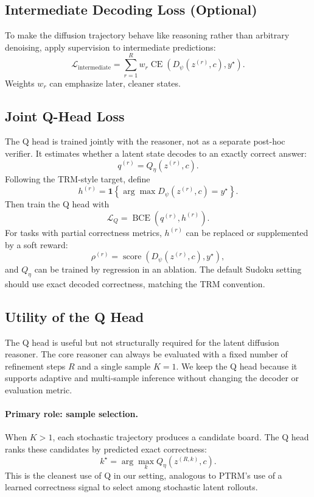 \documentclass[11pt]{article}
\begin{document}
\subsection{Intermediate Decoding Loss (Optional)}

To make the diffusion trajectory behave like reasoning rather than arbitrary denoising, apply supervision to intermediate predictions:
\[
    \mathcal L_{\mathrm{intermediate}}
    =
    \sum_{r=1}^{R} w_r
    \operatorname{CE}(D_\psi(z^{(r)},c),y^\star).
\]
Weights \(w_r\) can emphasize later, cleaner states.

\subsection{Joint Q-Head Loss}

The Q head is trained jointly with the reasoner, not as a separate post-hoc verifier. It estimates whether a latent state decodes to an exactly correct answer:
\[
    q^{(r)} = Q_\eta(z^{(r)},c).
\]
Following the TRM-style target, define
\[
    h^{(r)}
    =
    \mathbf 1
    \left\{
        \arg\max D_\psi(z^{(r)},c)=y^\star
    \right\}.
\]
Then train the Q head with
\[
    \mathcal L_Q
    =
    \operatorname{BCE}(q^{(r)},h^{(r)}).
\]
For tasks with partial correctness metrics, \(h^{(r)}\) can be replaced or supplemented by a soft reward:
\[
    \rho^{(r)} = \operatorname{score}(D_\psi(z^{(r)},c),y^\star),
\]
and \(Q_\eta\) can be trained by regression in an ablation. The default Sudoku setting should use exact decoded correctness, matching the TRM convention.

\subsection{Utility of the Q Head}

The Q head is useful but not structurally required for the latent diffusion reasoner. The core reasoner can always be evaluated with a fixed number of refinement steps \(R\) and a single sample \(K=1\). We keep the Q head because it supports adaptive and multi-sample inference without changing the decoder or evaluation metric.

\paragraph{Primary role: sample selection.}
When \(K>1\), each stochastic trajectory produces a candidate board. The Q head ranks these candidates by predicted exact correctness:
\[
    k^\star
    =
    \arg\max_k Q_\eta(z^{(R,k)},c).
\]
This is the cleanest use of Q in our setting, analogous to PTRM's use of a learned correctness signal to select among stochastic latent rollouts.
\end{document}
